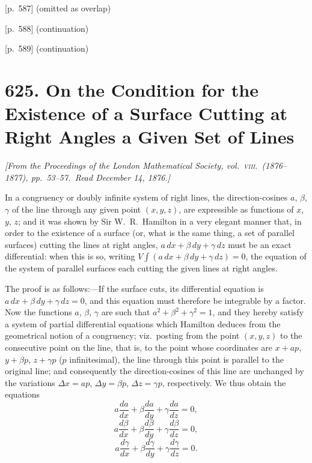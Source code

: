 \documentclass[11pt,a4paper]{book}
\begin{document}
\bigskip

[p.~587] (omitted as overlap)

\bigskip

[p.~588] (continuation)

\bigskip

[p.~589] (continuation)

\bigskip

\newpage
\section*{\textbf{625.} On the Condition for the Existence of a Surface Cutting at Right Angles a Given Set of Lines}

\textit{[From the Proceedings of the London Mathematical Society, vol.\ \textsc{viii}.\ (1876--1877), pp.~53--57.\ Read December 14, 1876.]}

\bigskip

In a congruency or doubly infinite system of right lines, the direction-cosines $a$, $\beta$, $\gamma$ of the line through any given point $(x, y, z)$, are expressible as functions of $x$, $y$, $z$; and it was shown by Sir W.\ R.\ Hamilton in a very elegant manner that, in order to the existence of a surface (or, what is the same thing, a set of parallel surfaces) cutting the lines at right angles, $a\, dx + \beta\, dy + \gamma\, dz$ must be an exact differential: when this is so, writing $V \int (a\, dx + \beta\, dy + \gamma\, dz) = 0$, the equation of the system of parallel surfaces each cutting the given lines at right angles.

The proof is as follows:---If the surface cuts, its differential equation is $a\, dx + \beta\, dy + \gamma\, dz = 0$, and this equation must therefore be integrable by a factor. Now the functions $a$, $\beta$, $\gamma$ are such that $a^2 + \beta^2 + \gamma^2 = 1$, and they hereby satisfy a system of partial differential equations which Hamilton deduces from the geometrical notion of a congruency; viz.\ posting from the point $(x, y, z)$ to the consecutive point on the line, that is, to the point whose coordinates are $x + a p$, $y + \beta p$, $z + \gamma p$ ($p$ infinitesimal), the line through this point is parallel to the original line; and consequently the direction-cosines of this line are unchanged by the variations $\Delta x = a p$, $\Delta y = \beta p$, $\Delta z = \gamma p$, respectively. We thus obtain the equations
\[
a \frac{da}{dx} + \beta \frac{da}{dy} + \gamma \frac{da}{dz} = 0,
\]
\[
a \frac{d\beta}{dx} + \beta \frac{d\beta}{dy} + \gamma \frac{d\beta}{dz} = 0,
\]
\[
a \frac{d\gamma}{dx} + \beta \frac{d\gamma}{dy} + \gamma \frac{d\gamma}{dz} = 0.
\]
\end{document}
